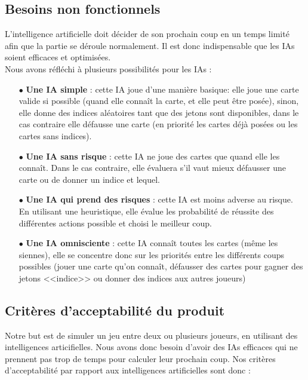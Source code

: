 \documentclass[11pt, letterpaper]{article}
\begin{document}
\subsection{Besoins non fonctionnels}

\noindent
L'intelligence artificielle doit décider de son prochain coup en un temps limité afin que la partie se déroule normalement. Il est donc indispensable que les IAs soient efficaces et optimisées. \\

\noindent
Nous avons réfléchi à plusieurs possibilités pour les IAs :\\

\begin{itemize}
    \item[$\bullet$] {\bfseries Une IA simple} : cette IA joue d'une manière basique: elle joue une carte valide si possible (quand elle connaît la carte, et elle peut être posée), sinon, elle donne des indices aléatoires tant que des jetons sont disponibles, dans le cas contraire elle défausse une carte (en priorité les cartes déjà posées ou les cartes sans indices).\\
    \item[$\bullet$] {\bfseries Une IA sans risque} : cette IA ne joue des cartes que quand elle les connaît. Dans le cas contraire, elle évaluera s'il vaut mieux défausser une carte ou de donner un indice et lequel.\\
    \item[$\bullet$] {\bfseries Une IA qui prend des risques} : cette IA est moins adverse au risque. En utilisant une heuristique, elle évalue les probabilité de réussite des différentes actions possible et choisi le meilleur coup. \\
    \item[$\bullet$] {\bfseries Une IA omnisciente} : cette IA connaît toutes les cartes (même les siennes), elle se concentre donc sur les priorités entre les différents coups possibles (jouer une carte qu'on connaît, défausser des cartes pour gagner des jetons <<indice>> ou donner des indices aux autres joueurs) 
\end{itemize}


\subsection{Critères d'acceptabilité du produit}

\noindent
Notre but est de simuler un jeu entre deux ou plusieurs joueurs, en utilisant des intelligences articifielles. Nous avons donc besoin d'avoir des IAs efficaces qui ne prennent pas trop de temps pour calculer leur prochain coup. Nos critères d'acceptabilité par rapport aux intelligences artificielles sont donc :\\
\end{document}
